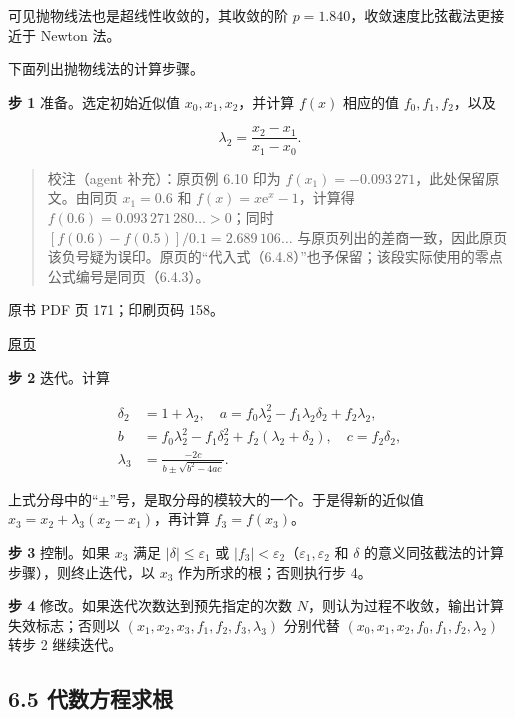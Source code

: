 可见抛物线法也是超线性收敛的，其收敛的阶 \(p=1.840\)，收敛速度比弦截法更接近于 Newton 法。

下面列出抛物线法的计算步骤。

\textbf{步 1} 准备。选定初始近似值 \(x_0,x_1,x_2\)，并计算 \(f(x)\) 相应的值 \(f_0,f_1,f_2\)，以及

\[
\lambda_2=\frac{x_2-x_1}{x_1-x_0}.
\]

\begin{quote}
校注（agent 补充）：原页例 6.10 印为 \(f(x_1)=-0.093\,271\)，此处保留原文。由同页 \(x_1=0.6\) 和 \(f(x)=x\mathrm{e}^x-1\)，计算得 \(f(0.6)=0.093\,271\,280\ldots>0\)；同时 \([f(0.6)-f(0.5)]/0.1=2.689\,106\ldots\) 与原页列出的差商一致，因此原页该负号疑为误印。原页的``代入式（6.4.8）''也予保留；该段实际使用的零点公式编号是同页（6.4.3）。
\end{quote}

\clearpage

原书 PDF 页 171；印刷页码 158。

\href{source-images/pdf-171.jpeg}{原页}

\textbf{步 2} 迭代。计算

\[
\begin{aligned}
\delta_2&=1+\lambda_2,\quad a=f_0\lambda_2^2-f_1\lambda_2\delta_2+f_2\lambda_2,\\
b&=f_0\lambda_2^2-f_1\delta_2^2+f_2(\lambda_2+\delta_2),\quad c=f_2\delta_2,\\
\lambda_3&=\frac{-2c}{b\pm\sqrt{b^2-4ac}}.
\end{aligned}
\]

上式分母中的``\(\pm\)''号，是取分母的模较大的一个。于是得新的近似值 \(x_3=x_2+\lambda_3(x_2-x_1)\)，再计算 \(f_3=f(x_3)\)。

\textbf{步 3} 控制。如果 \(x_3\) 满足 \(|\delta|\leqslant\varepsilon_1\) 或 \(|f_3|<\varepsilon_2\)（\(\varepsilon_1,\varepsilon_2\) 和 \(\delta\) 的意义同弦截法的计算步骤），则终止迭代，以 \(x_3\) 作为所求的根；否则执行步 4。

\textbf{步 4} 修改。如果迭代次数达到预先指定的次数 \(N\)，则认为过程不收敛，输出计算失效标志；否则以 \((x_1,\allowbreak x_2,\allowbreak x_3,\allowbreak f_1,\allowbreak f_2,\allowbreak f_3,\allowbreak \lambda_3)\) 分别代替 \((x_0,\allowbreak x_1,\allowbreak x_2,\allowbreak f_0,\allowbreak f_1,\allowbreak f_2,\allowbreak \lambda_2)\) 转步 2 继续迭代。

\subsection{6.5 代数方程求根}\label{ch06-ux4ee3ux6570ux65b9ux7a0bux6c42ux6839}

